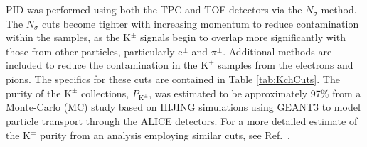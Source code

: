 \documentclass[ALICE,manyauthors]{cernphprep}
\newcommand{\Kpm}{$\mathrm{K^{\pm}}$\xspace}
\begin{document}
PID was performed using both the TPC and TOF detectors via the $N_{\sigma}$ method. 
The $N_{\sigma}$ cuts become tighter with increasing momentum to reduce contamination within the samples, as the \Kpm signals begin to overlap more significantly with those from other particles, particularly e$^{\pm}$ and $\pi^{\pm}$.
Additional methods are included to reduce the contamination in the \Kpm samples from the electrons and pions.  
The specifics for these cuts are contained in Table \ref{tab:KchCuts}.
The purity of the \Kpm collections, $P_{\mathrm{K}^{\pm}}$, was estimated to be approximately 97\% from a Monte-Carlo (MC) study based on HIJING \cite{PhysRevD.44.3501} simulations using GEANT3 \cite{Brun:1994aa} to model particle transport through the ALICE detectors. 
For a more detailed estimate of the \Kpm purity from an analysis employing similar cuts, see Ref.\ \cite{Acharya:2017qtq}.
\end{document}
